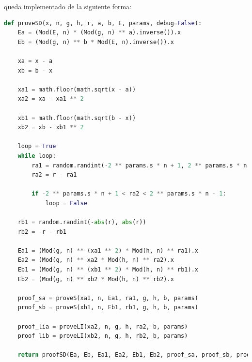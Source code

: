queda implementado de la siguiente forma:
\begin{lstlisting}[language=Python, basicstyle=\footnotesize]
def proveSD(x, n, g, h, r, a, b, E, params, debug=False):
    Ea = (Mod(E, n) * (Mod(g, n) ** a).inverse()).x
    Eb = (Mod(g, n) ** b * Mod(E, n).inverse()).x

    xa = x - a
    xb = b - x

    xa1 = math.floor(math.sqrt(x - a))
    xa2 = xa - xa1 ** 2

    xb1 = math.floor(math.sqrt(b - x))
    xb2 = xb - xb1 ** 2

    loop = True
    while loop:
        ra1 = random.randint(-2 ** params.s * n + 1, 2 ** params.s * n - 1)
        ra2 = r - ra1

        if -2 ** params.s * n + 1 < ra2 < 2 ** params.s * n - 1:
            loop = False

    rb1 = random.randint(-abs(r), abs(r))
    rb2 = -r - rb1

    Ea1 = (Mod(g, n) ** (xa1 ** 2) * Mod(h, n) ** ra1).x
    Ea2 = (Mod(g, n) ** xa2 * Mod(h, n) ** ra2).x
    Eb1 = (Mod(g, n) ** (xb1 ** 2) * Mod(h, n) ** rb1).x
    Eb2 = (Mod(g, n) ** xb2 * Mod(h, n) ** rb2).x

    proof_sa = proveS(xa1, n, Ea1, ra1, g, h, b, params)
    proof_sb = proveS(xb1, n, Eb1, rb1, g, h, b, params)

    proof_lia = proveLI(xa2, n, g, h, ra2, b, params)
    proof_lib = proveLI(xb2, n, g, h, rb2, b, params)

    return proofSD(Ea, Eb, Ea1, Ea2, Eb1, Eb2, proof_sa, proof_sb, proof_lia, proof_lib)
\end{lstlisting}

